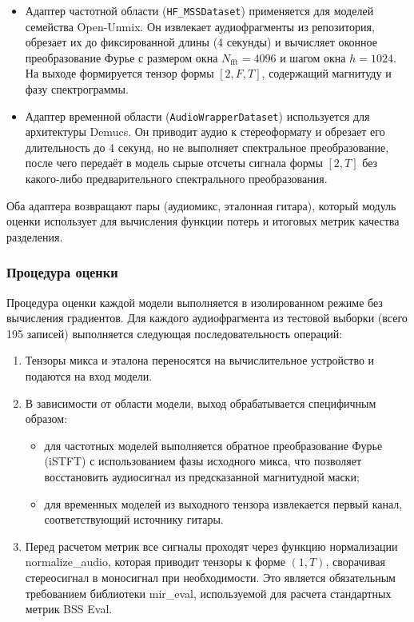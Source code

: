\documentclass[14pt]{extarticle}
\begin{document}
\begin{itemize}[label=$\bullet$, wide]
    \item Адаптер частотной области (\texttt{HF\_MSSDataset}) применяется для моделей семейства Open-Unmix. 
	Он извлекает аудиофрагменты из репозитория, обрезает их до фиксированной длины (4 секунды) и вычисляет оконное преобразование 
	Фурье с размером окна $N_{\text{fft}} = 4096$ и шагом окна $h = 1024$. На выходе формируется тензор формы $[2, F, T]$, содержащий магнитуду и фазу спектрограммы.
    \item Адаптер временной области (\texttt{AudioWrapperDataset}) используется для архитектуры Demucs. Он приводит аудио к стереоформату и 
	обрезает его длительность до 4 секунд, но не выполняет спектральное преобразование, после чего передаёт в модель сырые отсчеты сигнала формы $[2, T]$ без какого-либо предварительного спектрального преобразования.
\end{itemize}

Оба адаптера возвращают пары (аудиомикс, эталонная гитара), который модуль оценки использует для вычисления функции потерь и итоговых метрик качества разделения.

\subsubsection{Процедура оценки}

Процедура оценки каждой модели выполняется в изолированном режиме без вычисления градиентов. Для каждого аудиофрагмента 
из тестовой выборки (всего 195 записей) выполняется следующая последовательность операций:
\begin{enumerate}[label=\arabic*)]
    \item Тензоры микса и эталона переносятся на вычислительное устройство и подаются на вход модели.
    \item В зависимости от области модели, выход обрабатывается специфичным образом:
    \begin{itemize}[label=$\bullet$, wide]
        \item для частотных моделей выполняется обратное преобразование Фурье (iSTFT) с использованием 
		фазы исходного микса, что позволяет восстановить аудиосигнал из предсказанной магнитудной маски;
        \item для временных моделей из выходного тензора извлекается первый канал, соответствующий источнику гитары.
    \end{itemize}
    \item Перед расчетом метрик все сигналы проходят через функцию нормализации normalize\_audio, которая 
	приводит тензоры к форме $(1, T)$, сворачивая стереосигнал в моносигнал при необходимости. 
	Это является обязательным требованием библиотеки mir\_eval, используемой для расчета стандартных метрик 
	BSS Eval.
\end{enumerate}
\end{document}
